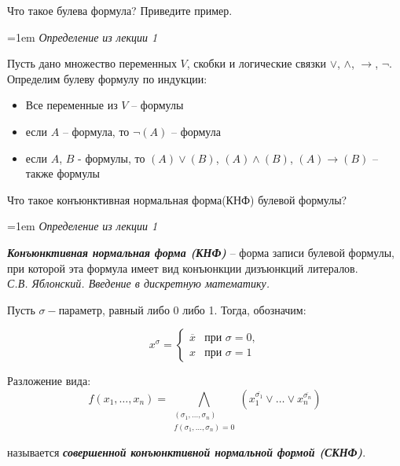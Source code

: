 \documentclass[12pt]{extreport}
\theoremstyle{definiton}
\theoremstyle{definition}
\theoremstyle{definition}
\newcommand{\solution}[2][\color{myblue}Ответ]{
\medskip
	\noindent{\bfseries #1 }{{\color{myblue}\bfseries #2:}}
}
\newenvironment{blockquote}{%
  \par%
  \medskip
  \leftskip=1em%
  \noindent}{%
  \par\medskip}
\begin{document}
	
			
\Pr[\textcolor{mygreen}{Алтана, DONE}] Что такое булева формула? Приведите пример.
			
\solution{1}
\begin{blockquote}
\textcolor{mypurpur}{\textit{Определение из лекции 1}}\\
{\color{myblue}
\noindent 
Пусть дано множество переменных $V$, скобки и логические связки $\vee$, $\wedge$, $\longrightarrow$, $\neg$. Определим булеву формулу по индукции:

\begin{itemize}
    \item Все переменные из $V$ -- формулы
    \item если $A$ -- формула, то $\neg(A)$ -- формула
    \item если $A$, $B$ - формулы, то $(A)\vee(B)$, $(A)\wedge(B)$, $(A)\longrightarrow(B)$ -- также формулы 
\end{itemize}
}
\end{blockquote}

\Pr[\textcolor{mygreen}{Каринэ, DONE}] Что такое конъюнктивная нормальная форма(КНФ) булевой формулы?

\solution{2}
\begin{blockquote}
\textcolor{mypurpur}{\textit{Определение из лекции 1}}\\
{\color{myblue}

\textbf{\textit{Конъюнктивная нормальная форма (КНФ)}} -- форма записи булевой
формулы, при которой эта формула имеет вид конъюнкции
дизъюнкций литералов. \\

\textcolor{mypurpur}{\textit{С.В. Яблонский. Введение в дискретную математику.}} 
\\
\par

Пусть \(\sigma - \)параметр, равный либо 0 либо 1. Тогда, обозначим:

\begin{equation*}
x^{\sigma} = 
 \begin{cases}
   \overline{x} &\text{при $\sigma=0,$}\\
   x &\text{при $\sigma=1$}
 \end{cases}
\end{equation*}

\par
Разложение вида:
\[f(x_1, \dots, x_n)= \bigwedge\limits_{\substack{(\sigma_1, \dots, \sigma_n)\\ f(\sigma_1, \dots, \sigma_n)=0}}(x_{1}^{\overline{\sigma_1}}\vee\dots\vee x_{n}^{\overline{\sigma_n}})\]

называется \textbf{\textit{совершенной конъюнктивной нормальной формой (СКНФ)}}.

}
\end{blockquote}
\end{document}
